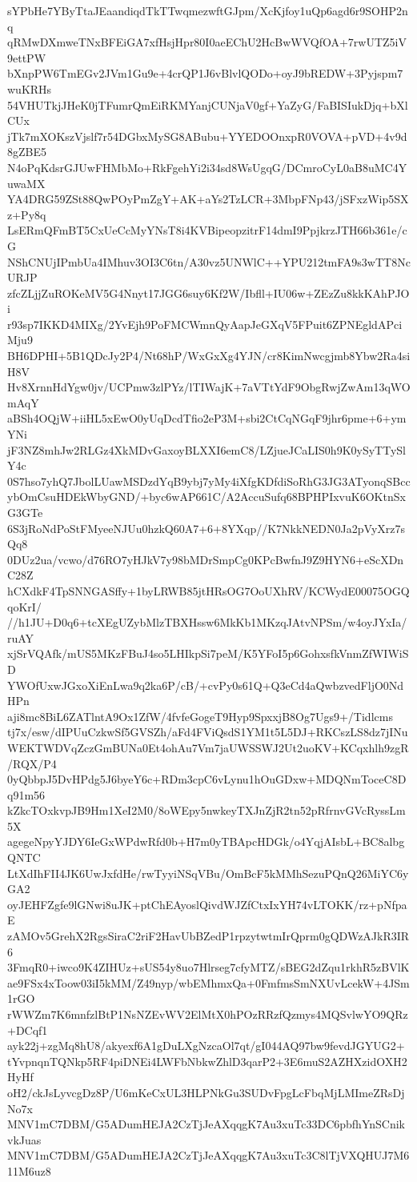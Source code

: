 sYPbHe7YByTtaJEaandiqdTkTTwqmezwftGJpm/XcKjfoy1uQp6agd6r9SOHP2nq
qRMwDXmweTNxBFEiGA7xfHsjHpr80I0aeEChU2HcBwWVQfOA+7rwUTZ5iV9ettPW
bXnpPW6TmEGv2JVm1Gu9e+4crQP1J6vBlvlQODo+oyJ9bREDW+3Pyjspm7wuKRHs
54VHUTkjJHeK0jTFumrQmEiRKMYanjCUNjaV0gf+YaZyG/FaBISIukDjq+bXlCUx
jTk7mXOKszVjslf7r54DGbxMySG8ABubu+YYEDOOnxpR0VOVA+pVD+4v9d8gZBE5
N4oPqKdsrGJUwFHMbMo+RkFgehYi2i34sd8WsUgqG/DCmroCyL0aB8uMC4YuwaMX
YA4DRG59ZSt88QwPOyPmZgY+AK+aYs2TzLCR+3MbpFNp43/jSFxzWip5SXz+Py8q
LsERmQFmBT5CxUeCcMyYNsT8i4KVBipeopzitrF14dmI9PpjkrzJTH66b361e/cG
NShCNUjIPmbUa4IMhuv3OI3C6tn/A30vz5UNWlC++YPU212tmFA9s3wTT8NcURJP
zfcZLjjZuROKeMV5G4Nnyt17JGG6suy6Kf2W/Ibfll+IU06w+ZEzZu8kkKAhPJOi
r93sp7IKKD4MIXg/2YvEjh9PoFMCWmnQyAapJeGXqV5FPuit6ZPNEgldAPciMju9
BH6DPHI+5B1QDcJy2P4/Nt68hP/WxGxXg4YJN/cr8KimNwcgjmb8Ybw2Ra4siH8V
Hv8XrnnHdYgw0jv/UCPmw3zlPYz/lTIWajK+7aVTtYdF9ObgRwjZwAm13qWOmAqY
aBSh4OQjW+iiHL5xEwO0yUqDcdTfio2eP3M+sbi2CtCqNGqF9jhr6pme+6+ymYNi
jF3NZ8mhJw2RLGz4XkMDvGaxoyBLXXI6emC8/LZjueJCaLIS0h9K0ySyTTySlY4c
0S7hso7yhQ7JbolLUawMSDzdYqB9ybj7yMy4iXfgKDfdiSoRhG3JG3ATyonqSBcc
ybOmCsuHDEkWbyGND/+byc6wAP661C/A2AccuSufq68BPHPIxvuK6OKtnSxG3GTe
6S3jRoNdPoStFMyeeNJUu0hzkQ60A7+6+8YXqp//K7NkkNEDN0Ja2pVyXrz7sQq8
0DUz2ua/vcwo/d76RO7yHJkV7y98bMDrSmpCg0KPcBwfnJ9Z9HYN6+eScXDnC28Z
hCXdkF4TpSNNGASffy+1byLRWB85jtHRsOG7OoUXhRV/KCWydE00075OGQqoKrI/
//h1JU+D0q6+tcXEgUZybMlzTBXHssw6MkKb1MKzqJAtvNPSm/w4oyJYxIa/ruAY
xjSrVQAfk/mUS5MKzFBuJ4so5LHIkpSi7peM/K5YFoI5p6GohxsfkVnmZfWIWiSD
YWOfUxwJGxoXiEnLwa9q2ka6P/cB/+cvPy0s61Q+Q3eCd4aQwbzvedFljO0NdHPn
aji8mc8BiL6ZATlntA9Ox1ZfW/4fvfeGogeT9Hyp9SpxxjB8Og7Ugs9+/Tidlcms
tj7x/esw/dIPUuCzkwSf5GVSZh/aFd4FViQsdS1YM1t5L5DJ+RKCszLS8dz7jINu
WEKTWDVqZczGmBUNa0Et4ohAu7Vm7jaUWSSWJ2Ut2uoKV+KCqxhlh9zgR/RQX/P4
0yQbbpJ5DvHPdg5J6byeY6c+RDm3cpC6vLynu1hOuGDxw+MDQNmToceC8Dq91m56
kZkcTOxkvpJB9Hm1XeI2M0/8oWEpy5nwkeyTXJnZjR2tn52pRfrnvGVcRyssLm5X
agegeNpyYJDY6IeGxWPdwRfd0b+H7m0yTBApcHDGk/o4YqjAIsbL+BC8albgQNTC
LtXdIhFII4JK6UwJxfdHe/rwTyyiNSqVBu/OmBcF5kMMhSezuPQnQ26MiYC6yGA2
oyJEHFZgfe9lGNwi8uJK+ptChEAyoslQivdWJZfCtxIxYH74vLTOKK/rz+pNfpaE
zAMOv5GrehX2RgsSiraC2riF2HavUbBZedP1rpzytwtmIrQprm0gQDWzAJkR3IR6
3FmqR0+iwco9K4ZIHUz+sUS54y8uo7Hlrseg7cfyMTZ/sBEG2dZqu1rkhR5zBVlK
ae9FSx4xToow03iI5kMM/Z49nyp/wbEMhmxQa+0FmfmsSmNXUvLcekW+4JSm1rGO
rWWZm7K6mnfzlBtP1NsNZEvWV2ElMtX0hPOzRRzfQzmys4MQSvlwYO9QRz+DCqf1
ayk22j+zgMq8hU8/akyexf6A1gDuLXgNzcaOl7qt/gI044AQ97bw9fevdJGYUG2+
tYvpnqnTQNkp5RF4piDNEi4LWFbNbkwZhlD3qarP2+3E6muS2AZHXzidOXH2HyHf
oH2/ckJsLyvcgDz8P/U6mKeCxUL3HLPNkGu3SUDvFpgLcFbqMjLMImeZRsDjNo7x
MNV1mC7DBM/G5ADumHEJA2CzTjJeAXqqgK7Au3xuTc33DC6pbfhYnSCnikvkJuas
MNV1mC7DBM/G5ADumHEJA2CzTjJeAXqqgK7Au3xuTc3C8lTjVXQHUJ7M611M6uz8
